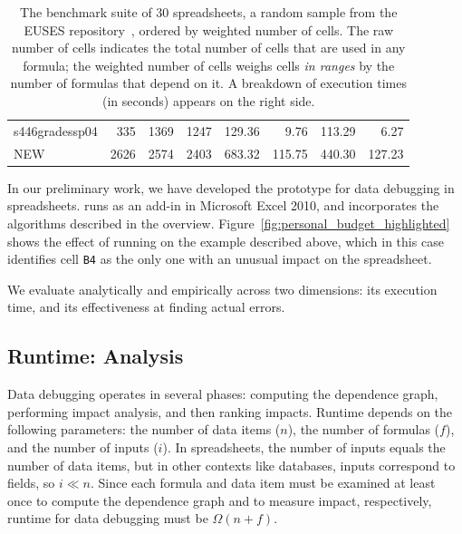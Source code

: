 {\begin{table}[!b]
\begin{tabular}{l|rrr||r|rrr}
\small{s446gradessp04} & \small{335} & \small{1369} & \small{1247} & \small{129.36} & \small{9.76} & \small{113.29} & \small{6.27} \\ 
\small{NEW} & \small{2626} & \small{2574} & \small{2403} & \small{683.32} & \small{115.75} & \small{440.30} & \small{127.23} \\ 
    \end{tabular}%
  \caption{The benchmark suite of 30 spreadsheets, a random sample from the EUSES repository~\cite{Fisher:2005:ESC:1082983.1083242}, ordered by weighted number of cells. The raw number of cells indicates the total number of cells that are used in any formula; the weighted number of cells weighs cells \emph{in ranges} by the number of formulas that depend on it. A breakdown of \checkcell{} execution times (in seconds) appears on the right side.\label{tab:spreadsheet_characteristics}}
\end{table}
}

In our preliminary work, we have developed the \checkcell{} prototype
for data debugging in spreadsheets.  \checkcell{} runs as an add-in in
Microsoft Excel 2010, and incorporates the algorithms described in the
overview. Figure~\ref{fig:personal_budget_highlighted} shows the
effect of running \checkcell{} on the example described above, which
in this case identifies cell \texttt{B4} as the only one with an
unusual impact on the spreadsheet.


We evaluate \checkcell{} analytically and empirically across
two dimensions: its execution time, and its effectiveness at finding
actual errors. 

\subsection{Runtime: Analysis}
\label{sec:asymptotic_analysis}

Data debugging operates in several phases: computing the dependence
graph, performing impact analysis, and then ranking impacts. Runtime
depends on the following parameters: the number of data items ($n$),
the number of formulas ($f$), and the number of inputs ($i$). In
spreadsheets, the number of inputs equals the number of data items,
but in other contexts like databases, inputs correspond to fields, so
$i \ll n$. Since each formula and data item must be examined at least
once to compute the dependence graph and to measure impact,
respectively, runtime for data debugging must be 
$\Omega(n+f)$.

